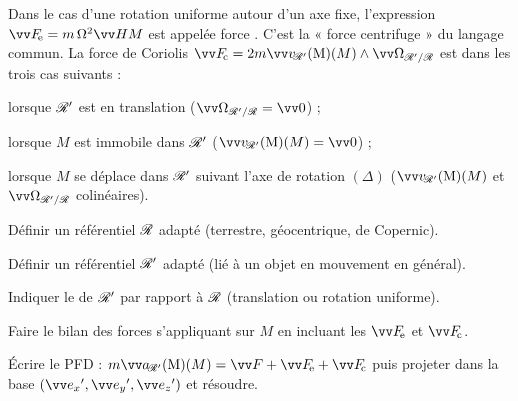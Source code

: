 \documentclass[12pt,fancy]{cours}
\begin{document}
Dans le cas d'une rotation uniforme autour d'un axe fixe, l'expression $\Fe = m \,\Omega^2 \Vec{HM}$ est appelée force . C'est la « force centrifuge » du langage commun. La force de Coriolis $\Fc = 2m \vRp(M) \pv \OR$ est  dans les trois cas suivants :
\begin{liste}
  \item lorsque $\mathcal{R}'$ est en translation ($\OR = \Vec{0}$) ;
  \item lorsque $M$ est immobile dans $\mathcal{R}'$ ($\vRp(M) = \Vec{0}$) ;
  \item lorsque $M$ se déplace dans $\mathcal{R}'$ suivant l'axe de rotation $(\Delta)$ ($\vRp(M)$ et $\OR$ colinéaires).
\end{liste}

\begin{methode}
  \item Définir un référentiel  $\mathcal{R}$ adapté (terrestre, géocentrique, de Copernic).
  \item Définir un référentiel  $\mathcal{R}'$ adapté (lié à un objet en mouvement en général).
  \item Indiquer le  de $\mathcal{R}'$ par rapport à $\mathcal{R}$ (translation ou rotation uniforme).
  \item Faire le bilan des forces s'appliquant sur $M$ en incluant les  $\Fe$ et $\Fc$.
  \item Écrire le PFD : $m\aRp(M) = \F + \Fe + \Fc$ puis projeter dans la base $(\ex',\ey',\ez')$ et résoudre.
\end{methode}
\end{document}
